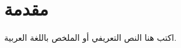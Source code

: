 \chapter*{\arabicfont مقدمة}

\begin{arabic}
اكتب هنا النص التعريفي أو الملخص باللغة العربية.
\end{arabic}
